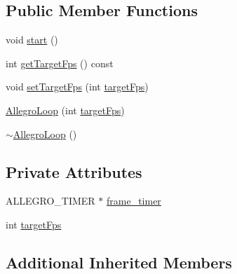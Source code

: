 \subsection*{Public Member Functions}
\begin{DoxyCompactItemize}
\item 
void \hyperlink{classZeta_1_1AllegroLoop_a95ef031ace6f929a450c80c9ecdaa057}{start} ()
\item 
int \hyperlink{classZeta_1_1AllegroLoop_ac422e8f5961d13161c63a3863236ce99}{get\+Target\+Fps} () const 
\item 
void \hyperlink{classZeta_1_1AllegroLoop_a845300a5ce14dd8fb8c7f2ffeb0afbb2}{set\+Target\+Fps} (int \hyperlink{classZeta_1_1AllegroLoop_a0ee2957a3e13030b26e3c87aec68317f}{target\+Fps})
\item 
\hyperlink{classZeta_1_1AllegroLoop_ab9b29f07be1ed13902a51291295768b4}{Allegro\+Loop} (int \hyperlink{classZeta_1_1AllegroLoop_a0ee2957a3e13030b26e3c87aec68317f}{target\+Fps})
\item 
\hyperlink{classZeta_1_1AllegroLoop_a1ba1e6ed2ebfb75a43c085139a20ae3d}{$\sim$\+Allegro\+Loop} ()
\end{DoxyCompactItemize}
\subsection*{Private Attributes}
\begin{DoxyCompactItemize}
\item 
A\+L\+L\+E\+G\+R\+O\+\_\+\+T\+I\+M\+E\+R $\ast$ \hyperlink{classZeta_1_1AllegroLoop_ac1fae67baa5962de17573211a1a93e16}{frame\+\_\+timer}
\item 
int \hyperlink{classZeta_1_1AllegroLoop_a0ee2957a3e13030b26e3c87aec68317f}{target\+Fps}
\end{DoxyCompactItemize}
\subsection*{Additional Inherited Members}


